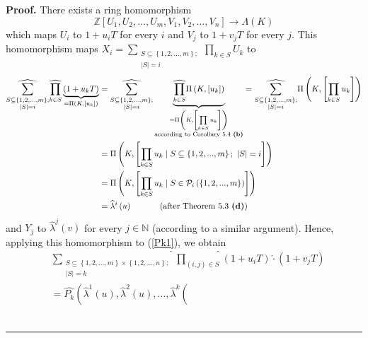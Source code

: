 \documentclass[numbers=enddot,12pt,final,onecolumn,notitlepage]{scrartcl}%
\newenvironment{proof}[1][Proof]{\noindent\textbf{#1.} }{\ \rule{0.5em}{0.5em}}
\begin{document}
\begin{proof}
There exists a ring homomorphism%
\[
\mathbb{Z}\left[  U_{1},U_{2},...,U_{m},V_{1},V_{2},...,V_{n}\right]
\rightarrow\Lambda\left(  K\right)
\]
which maps $U_{i}$ to $1+u_{i}T$ for every $i$ and $V_{j}$ to $1+v_{j}T$ for
every $j$. This homomorphism maps $X_{i}=\sum\limits_{\substack{S\subseteq
\left\{  1,2,...,m\right\}  ;\\\left\vert S\right\vert =i}}\prod\limits_{k\in
S}U_{k}$ to%
\begin{align*}
\widehat{\sum\limits_{\substack{S\subseteq\left\{  1,2,...,m\right\}
;\\\left\vert S\right\vert =i}}}\widehat{\prod\limits_{k\in S}}%
\underbrace{\left(  1+u_{k}T\right)  }_{=\Pi\left(  K,\left[  u_{k}\right]
\right)  }  &  =\widehat{\sum\limits_{\substack{S\subseteq\left\{
1,2,...,m\right\}  ;\\\left\vert S\right\vert =i}}}\underbrace{\widehat{\prod
\limits_{k\in S}}\Pi\left(  K,\left[  u_{k}\right]  \right)  }_{\substack{=\Pi
\left(  K,\left[  \prod\limits_{k\in S}u_{k}\right]  \right)
\\\text{according to Corollary 5.4 \textbf{(b)}}}}=\widehat{\sum
\limits_{\substack{S\subseteq\left\{  1,2,...,m\right\}  ;\\\left\vert
S\right\vert =i}}}\Pi\left(  K,\left[  \prod\limits_{k\in S}u_{k}\right]
\right) \\
&  =\Pi\left(  K,\left[  \prod\limits_{k\in S}u_{k}\mid S\subseteq\left\{
1,2,...,m\right\}  ;\ \left\vert S\right\vert =i\right]  \right) \\
&  =\Pi\left(  K,\left[  \prod\limits_{k\in S}u_{k}\mid S\in\mathcal{P}%
_{i}\left(  \left\{  1,2,...,m\right\}  \right)  \right]  \right) \\
&  =\widehat{\lambda}^{i}\left(  u\right)  \ \ \ \ \ \ \ \ \ \ \left(
\text{after Theorem 5.3 \textbf{(d)}}\right)
\end{align*}
and $Y_{j}$ to $\widehat{\lambda}^{j}\left(  v\right)  $ for every
$j\in\mathbb{N}$ (according to a similar argument). Hence, applying this
homomorphism to (\ref{Pk1}), we obtain%
\begin{align*}
&  \widehat{\sum_{\substack{S\subseteq\left\{  1,2,...,m\right\}
\times\left\{  1,2,...,n\right\}  ;\\\left\vert S\right\vert =k}%
}}\widehat{\prod_{\left(  i,j\right)  \in S}}\left(  1+u_{i}T\right)
\widehat{\cdot}\left(  1+v_{j}T\right) \\
&  =\widehat{P_{k}}\left(  \widehat{\lambda}^{1}\left(  u\right)
,\widehat{\lambda}^{2}\left(  u\right)  ,...,\widehat{\lambda}^{k}\left(

\end{align*}
\end{proof}
\end{document}
